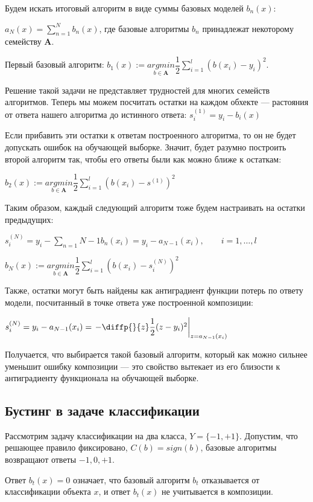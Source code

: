 \documentclass{article}
\theoremstyle{definition}
\theoremstyle{theorem}
\theoremstyle{remark}
\theoremstyle{theorem}
\theoremstyle{example}
\theoremstyle{theorem}
\theoremstyle{theorem}
\theoremstyle{theorem}
\theoremstyle{theorem}
\begin{document}
Будем искать итоговый алгоритм в виде суммы базовых моделей $b_n(x)$:

$a_N(x) = \sum_{n=1}^{N}b_n(x)$, где базовые алгоритмы $b_n$ принадлежат некоторому семейству $\mathbf{A}$.

Первый базовый алгоритм: $b_1(x):= \underset{b\in\mathbf{A}}{argmin} \dfrac{1}{2}\sum_{i=1}^{l}(b(x_i)-y_i)^2$.

Решение такой задачи не представляет трудностей для многих семейств алгоритмов. Теперь мы можем посчитать остатки на каждом обхекте --- растояния от ответа нашего алгоритма до истинного ответа: $s^{(1)}_i = y_i - b_i(x)$

Если прибавить эти остатки к ответам построенного алгоритма, то он не будет допускать ошибок на обучающей выборке. Значит, будет разумно построить второй алгоритм так, чтобы его ответы были как можно ближе к остаткам:

$b_2(x) := \underset{b\in\mathbf{A}}{argmin} \dfrac{1}{2}\sum_{i=1}^{l}(b(x_i)-s^{(1)})^2$

Таким образом, каждый следующий алгоритм тоже будем настраивать на остатки предыдущих:

$s^{(N)}_i = y_i - \sum_{n=1}{N-1}b_n(x_i) = y_i - a_{N-1}(x_i),\qquad i=1,\ldots,l$

$b_N(x):= \underset{b\in\mathbf{A}}{argmin} \dfrac{1}{2}\sum_{i=1}^{l}(b(x_i)-s_i^{(N)})^2$

Также, остатки могут быть найдены как антиградиент функции потерь по ответу модели, посчитанный в точке ответа уже построенной композиции:

$s_i^{(N)} = y_i - a_{N-1}(x_i)= \left.- \diffp{}{z}\dfrac{1}{2}(z-y_i)^2\right|_{z=a_{N-1}(x_i)}$

Получается, что выбирается такой базовый алгоритм, который как можно сильнее уменьшит ошибку композиции — это свойство вытекает из его близости к антиградиенту функционала на обучающей выборке.

\subsection{Бустинг в задаче классификации}

Рассмотрим задачу классификации на два класса, $Y = \{-1, +1\}$. Допустим, что решающее правило фиксировано, $C(b) = sign(b)$, базовые алгоритмы возвращают ответы $-1, 0, +1$. 
\vspace{0.2cm}

Ответ $b_t(x) = 0$ означает, что базовый алгоритм $b_t$ отказывается от классификации объекта $x$, и ответ $b_t(x)$ не учитывается в композиции.
\vspace{0.2cm}
\end{document}
